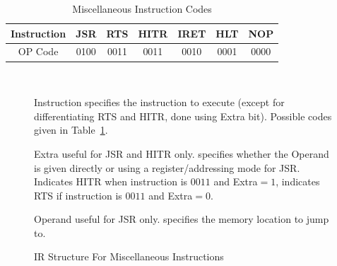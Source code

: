 \documentclass[12pt]{article}
\theoremstyle{plain}
\theoremstyle{definition}
\begin{document}
    \begin{table}[H]
        \centering
        \begin{tabular}{|c|c|c|c|c|c|c|}
            \hline
            Instruction & JSR  & RTS  & HITR  & IRET  & HLT  & NOP  \\ \hline
            OP Code     & 0100 & 0011 & 0011 & 0010 & 0001 & 0000 \\ \hline
        \end{tabular}
        \caption{Miscellaneous Instruction Codes}
        \label{misc-op-codes}
    \end{table}
    \begin{figure}[H]
        \centering
        \caption{IR Structure For Miscellaneous Instructions}
        \label{IR-Misc}
        \vspace{0.5 cm}
         \\
        \vspace{0.5 cm}
        \begin{regdesc}\begin{reglist}            
            \item [Instruction] specifies the instruction to execute (except for differentiating RTS and HITR, done using Extra bit). Possible codes given in Table~\ref{misc-op-codes}.
            \item [Extra] useful for JSR and HITR only. specifies whether the Operand is given directly or using a register/addressing mode for JSR. Indicates HITR when instruction is $0011$ and Extra$=1$, indicates RTS if instruction is $0011$ and Extra$=0$. 
            \item [Operand] useful for JSR only. specifies the memory location to jump  to.
        \end{reglist}\end{regdesc}
    \end{figure}
\pagebreak
\end{document}
